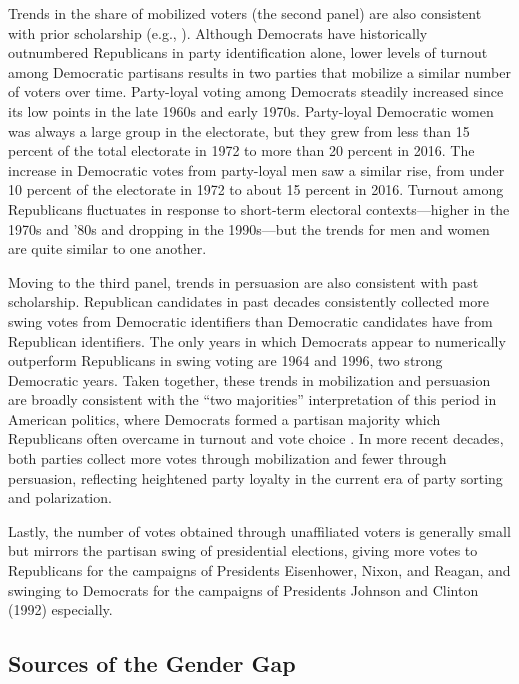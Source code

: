 \documentclass[12pt
               ,final
               ]{article}
\begin{document}
Trends in the share of mobilized voters (the second panel) are also consistent with prior scholarship (e.g., \citealt{flanigan2015}). Although Democrats have historically outnumbered Republicans in party identification alone, lower levels of turnout among Democratic partisans results in two parties that mobilize a similar number of voters over time. Party-loyal voting among Democrats steadily increased since its low points in the late 1960s and early 1970s. Party-loyal Democratic women was always a large group in the electorate, but they grew from less than 15 percent of the total electorate in 1972 to more than 20 percent in 2016. The increase in Democratic votes from party-loyal men saw a similar rise, from under 10 percent of the electorate in 1972 to about 15 percent in 2016. Turnout among Republicans fluctuates in response to short-term electoral contexts---higher in the 1970s and '80s and dropping in the 1990s---but the trends for men and women are quite similar to one another.

Moving to the third panel, trends in persuasion are also consistent with past scholarship. Republican candidates in past decades consistently collected more swing votes from Democratic identifiers than Democratic candidates have from Republican identifiers. The only years in which Democrats appear to numerically outperform Republicans in swing voting are 1964 and 1996, two strong Democratic years. Taken together, these trends in mobilization and persuasion are broadly consistent with the ``two majorities'' interpretation of this period in American politics, where Democrats formed a partisan majority which Republicans often overcame in turnout and vote choice \citep{claggettshafer1995twomajorities}. In more recent decades, both parties collect more votes through mobilization and fewer through persuasion, reflecting heightened party loyalty in the current era of party sorting and polarization.

Lastly, the number of votes obtained through unaffiliated voters is generally small but mirrors the partisan swing of presidential elections, giving more votes to Republicans for the campaigns of Presidents Eisenhower, Nixon, and Reagan, and swinging to Democrats for the campaigns of Presidents Johnson and Clinton (1992) especially.



\subsection*{Sources of the Gender Gap}
\end{document}
